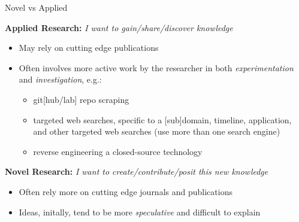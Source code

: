 
\begin{frame}{Novel vs Applied}

\textbf{Applied Research:} \textit{I want to gain/share/discover knowledge}\vspace{0.5em}
\begin{itemize}
    \item May rely on cutting edge publications
    \item Often involves more active work by the researcher in both \textit{experimentation} and \textit{investigation}, e.g.: 
        \begin{itemize}
            \item git[hub/lab] repo scraping 
            \item targeted web searches, specific to a [sub]domain, timeline, application, and other
                targeted web searches (use more than one search engine)
            \item reverse engineering a closed-source technology
        \end{itemize}
\end{itemize}\vspace{2em}

\textbf{Novel Research:} \textit{I want to create/contribute/posit this new knowledge}\vspace{0.5em}
\begin{itemize}
    \item Often rely more on cutting edge journals and publications
    \item Ideas, initally, tend to be more \textit{speculative} and difficult to explain
\end{itemize}

\end{frame}
